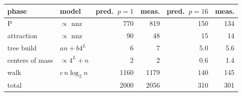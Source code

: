 \begin{tabular}{l l r r r r}
\toprule
phase & model & pred.\ $p{=}1$ & meas. & pred.\ $p{=}16$ & meas.\\
\midrule
P & $\propto$ nnz & 770 & 819 & 150 & 134\\
attraction & $\propto$ nnz & 90 & 48 & 15 & 14\\
tree build & $a n + b 4^L$ & 6 & 7 & 5.0 & 5.6\\
centers of mass & $\propto 4^L + n$ & 2 & 2 & 0.6 & 1.4\\
walk & $c\, n \log_2 n$ & 1160 & 1179 & 140 & 145\\
\midrule
total &  & 2000 & 2056 & 310 & 301\\
\bottomrule
\end{tabular}
